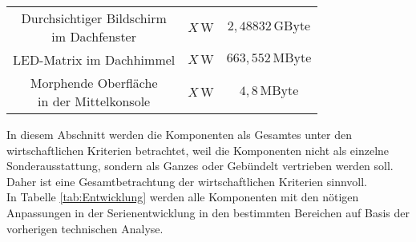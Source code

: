 \begin{table}[hbt]
\begin{tabular}{c|cc}
		\parbox[t]{0.3\linewidth}{\centering Durchsichtiger Bildschirm\\im Dachfenster} & $ X\,\mathrm{W} $ & $ 2,48832\,\mathrm{GByte} $ \\
		\parbox[t]{0.3\linewidth}{\centering LED-Matrix im Dachhimmel} & $ X\,\mathrm{W} $ & $ 663,552\,\mathrm{MByte} $ \\
		\parbox[t]{0.3\linewidth}{\centering Morphende Oberfläche\\in der Mittelkonsole} & $ X\,\mathrm{W} $ & $ 4,8\,\mathrm{MByte} $ \\
	\end{tabular} 
\end{table}
In diesem Abschnitt werden die Komponenten als Gesamtes unter den wirtschaftlichen Kriterien betrachtet, weil die Komponenten nicht als einzelne Sonderausstattung, sondern als Ganzes oder Gebündelt vertrieben werden soll. Daher ist eine Gesamtbetrachtung der wirtschaftlichen Kriterien sinnvoll. \\
In Tabelle \ref{tab:Entwicklung} werden alle Komponenten mit den nötigen Anpassungen in der Serienentwicklung in den bestimmten Bereichen auf Basis der vorherigen technischen Analyse. 
